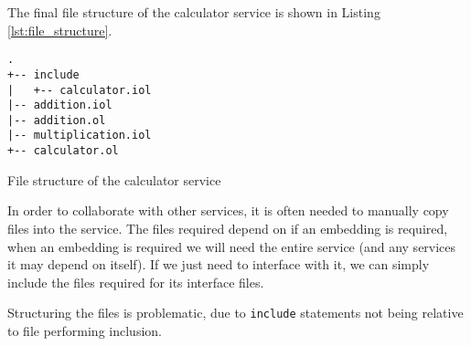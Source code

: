 The final file structure of the calculator service is shown in Listing
\ref{lst:file_structure}.

\begin{listing}[H]
\begin{verbatim}
.
+-- include
|   +-- calculator.iol
|-- addition.iol
|-- addition.ol
|-- multiplication.iol
+-- calculator.ol
\end{verbatim}
\caption{File structure of the calculator service}
\label{lst:file_structure}
\end{listing}

\begin{observation}

    In order to collaborate with other services, it is often needed to manually
    copy files into the service. The files required depend on if an embedding
    is required, when an embedding is required we will need the entire service
    (and any services it may depend on itself). If we just need to interface
    with it, we can simply include the files required for its interface files.

    Structuring the files is problematic, due to \verb!include! statements not
    being relative to file performing inclusion.

\end{observation}

